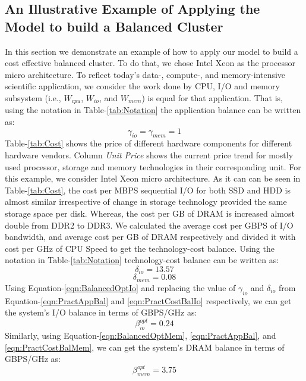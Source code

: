 \documentclass[journal]{IEEEtran}
\begin{document}
\subsection{An Illustrative Example of Applying the Model to build a Balanced Cluster}
In this section we demonstrate an example of how to apply our model to build a cost effective balanced cluster. To do that, we chose Intel Xeon as the processor micro architecture. To reflect today's data-, compute-, and memory-intensive scientific application, we consider the work done by CPU, I/O and memory subsystem (i.e., $W_{cpu}$, $W_{io}$, and $W_{mem}$) is equal for that application. That is, using the notation in Table-\ref{tab:Notation} the application balance  can be written as:
\begin{equation} \label{eqn:PractAppBal}
\gamma_{io} = \gamma_{mem} = 1
\end{equation}
Table-\ref{tab:Cost} shows the price of different hardware components for different hardware vendors. Column \textit{Unit Price} shows the current price trend  for mostly used processor, storage and memory technologies in their corresponding unit. For this example, we consider Intel Xeon micro architecture. As it can can be seen in  Table-\ref{tab:Cost}, the cost per MBPS sequential I/O for both SSD and HDD is almost similar irrespective of change in storage technology provided the same storage space per disk. Whereas, the cost per GB of DRAM is increased almost double from DDR2 to DDR3. We calculated the average cost per GBPS of I/O bandwidth, and average cost per GB of DRAM respectively and divided it with cost per GHz of CPU Speed to get the technology-cost balance. Using the notation in Table-\ref{tab:Notation} technology-cost balance can be written as: 
\begin{equation} \label{eqn:PractCostBalIo}
\delta_{io} = 13.57 
\end{equation}
\begin{equation} \label{eqn:PractCostBalMem}
\delta_{mem} = 0.08
\end{equation}
Using Equation-\ref{eqn:BalancedOptIo} and replacing the value of $\gamma_{io}$ and $\delta_{io}$ from Equation-\ref{eqn:PractAppBal} and \ref{eqn:PractCostBalIo} respectively, we can get the system's I/O balance in terms of GBPS/GHz as:
\begin{equation} \label{eqn:PractSysBalIo}
\beta_{io}^{opt} = 0.24 
\end{equation}
Similarly, using Equation-\ref{eqn:BalancedOptMem}, \ref{eqn:PractAppBal}, and \ref{eqn:PractCostBalMem}, we can get the system's DRAM balance in terms of GBPS/GHz as:
\begin{equation} \label{eqn:PractSysBalMem}
\beta_{mem}^{opt} = 3.75
\end{equation} 
\end{document}
